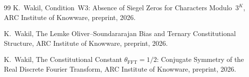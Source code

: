 \documentclass[12pt]{amsart}
\theoremstyle{plain}
\theoremstyle{definition}
\theoremstyle{remark}
\begin{document}
\begin{thebibliography}{99}
K.~Wakil,
Condition~W3: Absence of Siegel Zeros for Characters Modulo~$3^K$,
ARC Institute of Knowware, preprint, 2026.

K.~Wakil,
The Lemke Oliver--Soundararajan Bias and Ternary Constitutional Structure,
ARC Institute of Knowware, preprint, 2026.

K.~Wakil,
The Constitutional Constant $\theta_{\mathrm{FFT}} = 1/2$: Conjugate Symmetry
of the Real Discrete Fourier Transform,
ARC Institute of Knowware, preprint, 2026.

\end{thebibliography}
\end{document}
